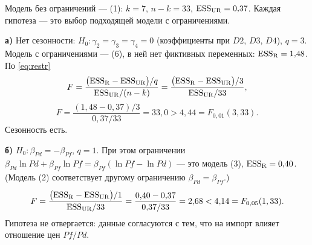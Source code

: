 \begin{solution}
Модель без ограничений — (1): $k = 7$, $n - k = 33$,
$\mathrm{ESS}_{\mathrm{UR}} = 0{,}37$. Каждая гипотеза — это выбор подходящей модели с
ограничениями.

\medskip
\textbf{а)} Нет сезонности: $H_0\colon \gamma_2 = \gamma_3 = \gamma_4 = 0$
(коэффициенты при $D2$, $D3$, $D4$), $q = 3$. Модель с ограничениями — (6),
в ней нет фиктивных переменных: $\mathrm{ESS}_{\mathrm{R}} = 1{,}48$. По
\eqref{eq:restr}
\[
  F = \frac{\bigl(\mathrm{ESS}_{\mathrm{R}} - \mathrm{ESS}_{\mathrm{UR}}\bigr)/q}
           {\mathrm{ESS}_{\mathrm{UR}}/(n-k)}
    = \frac{\bigl(\mathrm{ESS}_{\mathrm{R}} - \mathrm{ESS}_{\mathrm{UR}}\bigr)/3}
           {\mathrm{ESS}_{\mathrm{UR}}/33},
\]
\[
  F = \frac{(1{,}48 - 0{,}37)/3}{0{,}37/33} = 33{,}0 > 4{,}44 = F_{0{,}01}(3, 33).
\]
Сезонность есть.

\medskip
\textbf{б)} $H_0\colon \beta_{\mathit{Pd}} = -\beta_{\mathit{Pf}}$, $q = 1$.
При этом ограничении
$\beta_{\mathit{Pd}}\ln\mathit{Pd} + \beta_{\mathit{Pf}}\ln\mathit{Pf} =
\beta_{\mathit{Pf}}(\ln\mathit{Pf} - \ln\mathit{Pd})$ — это модель (3),
$\mathrm{ESS}_{\mathrm{R}} = 0{,}40$. (Модель (2) соответствует другому ограничению
$\beta_{\mathit{Pd}} = \beta_{\mathit{Pf}}$.)
\[
  F = \frac{\bigl(\mathrm{ESS}_{\mathrm{R}} - \mathrm{ESS}_{\mathrm{UR}}\bigr)/1}
           {\mathrm{ESS}_{\mathrm{UR}}/33}
    = \frac{0{,}40 - 0{,}37}{0{,}37/33} = 2{,}68 < 4{,}14 = F_{0{,}05}(1, 33).
\]
Гипотеза не отвергается: данные согласуются с тем, что на импорт влияет
отношение цен $\mathit{Pf}/\mathit{Pd}$.
\end{solution}


